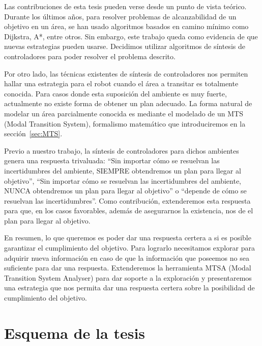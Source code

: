 Las contribuciones de esta tesis pueden verse desde un punto de vista teórico. 
Durante los últimos años, para resolver problemas de alcanzabilidad de un 
objetivo en un área, se han usado algoritmos basados en camino mínimo como 
Dijkstra, A*, entre otros. Sin embargo, este trabajo queda como evidencia de 
que nuevas estrategias pueden usarse. Decidimos utilizar algoritmos de síntesis 
de controladores para poder resolver el problema descrito.

Por otro lado, las técnicas existentes de síntesis de controladores nos 
permiten hallar una estrategia para el robot cuando el área a transitar es 
totalmente conocida. Para casos donde esta suposición del ambiente es muy 
fuerte, actualmente no existe forma de obtener un plan adecuado. La forma 
natural de modelar un área parcialmente conocida es mediante el modelado de un 
MTS (Modal Transition System), formalismo matemático que introduciremos en la 
sección~\ref{sec:MTS}. 

Previo a nuestro trabajo, la síntesis de controladores para dichos ambientes 
genera una respuesta trivaluada: ``Sin importar cómo se resuelvan las 
incertidumbres del ambiente, SIEMPRE obtendremos un plan para llegar al 
objetivo'', ``Sin importar cómo se resuelvan las incertidumbres del ambiente, 
NUNCA obtendremos un plan para llegar al objetivo'' o ``depende de cómo se 
resuelvan las incertidumbres''. Como contribución, extenderemos esta respuesta 
para que, en los casos favorables, además de asegurarnos la existencia, nos de 
el plan para llegar al objetivo.

En resumen, lo que queremos es poder dar una respuesta certera a si es posible 
garantizar 
el cumplimiento del objetivo. 
Para lograrlo necesitamos explorar para adquirir nueva información en caso de 
que la información que poseemos no sea 
suficiente para dar una respuesta. Extenderemos la herramienta MTSA (Modal 
Transition System Analyser) para dar soporte 
a la exploración y presentaremos una estrategia que nos permita dar una 
respuesta certera sobre la posibilidad de 
cumplimiento del objetivo.


\section{Esquema de la tesis}

